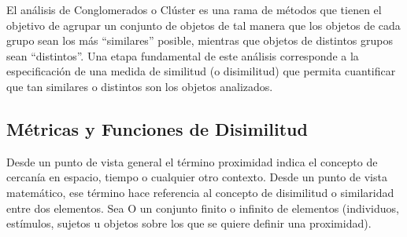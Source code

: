 \documentclass[12pt,oneside]{book}\usepackage[]{graphicx}\usepackage[]{color}
\theoremstyle{definition} %
\begin{document}

El análisis de Conglomerados o Clúster es una rama de métodos que tienen el objetivo de agrupar un conjunto de objetos de tal manera que los objetos de cada grupo sean los más ``similares'' posible, mientras que objetos de distintos grupos sean ``distintos''. Una etapa fundamental de este análisis corresponde a la especificación de una medida de similitud (o disimilitud) que permita cuantificar que tan similares o distintos son los objetos analizados.



\subsection{Métricas y Funciones de Disimilitud}

Desde un punto de vista general el término proximidad indica el concepto de cercanía en espacio, tiempo o cualquier otro contexto. Desde un punto de vista matemático, ese término hace referencia al concepto de disimilitud o similaridad entre dos elementos. 
Sea O un conjunto finito o infinito de elementos (individuos, estímulos, sujetos u objetos sobre los que se quiere definir una proximidad).
\end{document}
